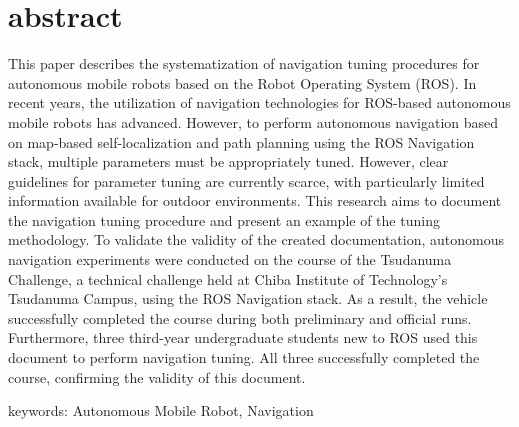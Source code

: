 \chapter*{abstract}
\thispagestyle{empty}
%
\begin{center}
  \scalebox{1.3}{Systematization of Navigation Adjustment Procedures}
  \scalebox{1.3}{for ROS-Based Autonomous Mobile Robots}
\end{center}
\vspace{1.0zh}
%
This paper describes the systematization of navigation tuning procedures for autonomous mobile robots based on the Robot Operating System (ROS). 
In recent years, the utilization of navigation technologies for ROS-based autonomous mobile robots has advanced. However, to perform autonomous navigation based on map-based self-localization and path planning using the ROS Navigation stack, multiple parameters must be appropriately tuned. 
However, clear guidelines for parameter tuning are currently scarce, with particularly limited information available for outdoor environments. 
This research aims to document the navigation tuning procedure and present an example of the tuning methodology. 
To validate the validity of the created documentation, autonomous navigation experiments were conducted on the course of the Tsudanuma Challenge, a technical challenge held at Chiba Institute of Technology's Tsudanuma Campus, using the ROS Navigation stack. 
As a result, the vehicle successfully completed the course during both preliminary and official runs. 
Furthermore, three third-year undergraduate students new to ROS used this document to perform navigation tuning. All three successfully completed the course, confirming the validity of this document. 


\vspace{1.0zh}

keywords: Autonomous Mobile Robot, Navigation
